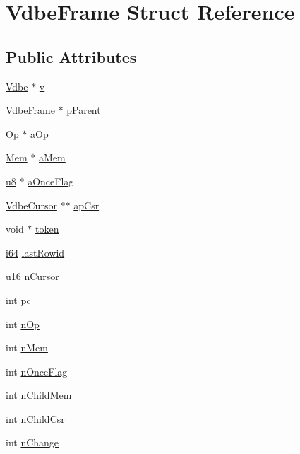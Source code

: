 \hypertarget{struct_vdbe_frame}{\section{Vdbe\-Frame Struct Reference}
\label{struct_vdbe_frame}
}
\subsection*{Public Attributes}
\begin{DoxyCompactItemize}
\item 
\hyperlink{struct_vdbe}{Vdbe} $\ast$ \hyperlink{struct_vdbe_frame_a2f6258356959c94398d1d006a740c4ce}{v}
\item 
\hyperlink{struct_vdbe_frame}{Vdbe\-Frame} $\ast$ \hyperlink{struct_vdbe_frame_afb11d8aa920f34720333f52737375d59}{p\-Parent}
\item 
\hyperlink{sqlite3_8c_af3e8e0a774ea3e53b5d64297468c3298}{Op} $\ast$ \hyperlink{struct_vdbe_frame_a0e5670c52e8eeb7e66bf1e3bff8ce2b5}{a\-Op}
\item 
\hyperlink{struct_mem}{Mem} $\ast$ \hyperlink{struct_vdbe_frame_a98b9eabf633e77d4ae2dfe9d13a43fdf}{a\-Mem}
\item 
\hyperlink{sqlite3_8c_a74a0f6424ae628af25f23f0a35f6ead3}{u8} $\ast$ \hyperlink{struct_vdbe_frame_a92608c14f2aa3be81e65d59000ef8bd8}{a\-Once\-Flag}
\item 
\hyperlink{struct_vdbe_cursor}{Vdbe\-Cursor} $\ast$$\ast$ \hyperlink{struct_vdbe_frame_a5d373b3a195dbd1a31f5aa0dbe1822ee}{ap\-Csr}
\item 
void $\ast$ \hyperlink{struct_vdbe_frame_a11de10011ea2164995c6b616bba8a576}{token}
\item 
\hyperlink{sqlite3_8c_a2a0f0f4ae7001eb54351f77ea1cdbcfd}{i64} \hyperlink{struct_vdbe_frame_af655193217fb53c7acab9d24c94344aa}{last\-Rowid}
\item 
\hyperlink{sqlite3_8c_a20f2299e322dcbde37cb07b16910b843}{u16} \hyperlink{struct_vdbe_frame_af6d743df3f86ff683959562c1b615655}{n\-Cursor}
\item 
int \hyperlink{struct_vdbe_frame_aed0e6d8cb1908580a3c2aca04516b46c}{pc}
\item 
int \hyperlink{struct_vdbe_frame_acffd5d53fbb5cb55e257c34a547c1762}{n\-Op}
\item 
int \hyperlink{struct_vdbe_frame_ab340f2b5f6d6e09a872f5f8a64fec245}{n\-Mem}
\item 
int \hyperlink{struct_vdbe_frame_a04707991a2907a48a1c3b76f3da4d26b}{n\-Once\-Flag}
\item 
int \hyperlink{struct_vdbe_frame_a833bdf519676567bc3a700cdedc6562d}{n\-Child\-Mem}
\item 
int \hyperlink{struct_vdbe_frame_a2d2900348092258d12eb71057812429a}{n\-Child\-Csr}
\item 
int \hyperlink{struct_vdbe_frame_a77aacb67d627f4446dd50a795b5a2f0f}{n\-Change}
\end{DoxyCompactItemize}


